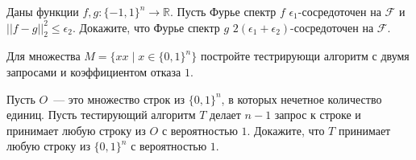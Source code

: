 \begin{task}
    Даны функции $f, g: \{-1, 1\}^n \to \mathbb{R}$. Пусть Фурье спектр $f$ $\epsilon_1$-сосредоточен на $\mathcal{F}$ и
    $||f - g||_2^2 \le \epsilon_2$. Докажите, что Фурье спектр $g$ $2 (\epsilon_1 + \epsilon_2)$-сосредоточен на $\mathcal{F}$.
\end{task}

\begin{task}
	Для множества $M = \{xx \mid x \in \{0, 1\}^n\}$ постройте тестрирующи алгоритм с двумя запросами и коэффициентом отказа $1$.
\end{task}

\begin{task}
	Пусть $O$~--- это множество строк из $\{0,1\}^n$, в которых нечетное количество единиц. Пусть тестирующий алгоритм $T$ делает
    $n - 1$ запрос к строке и принимает любую строку из $O$ с вероятностью $1$. Докажите, что $T$ принимает любую строку из $\{0,
    1\}^n$ с вероятностью $1$.
\end{task}


